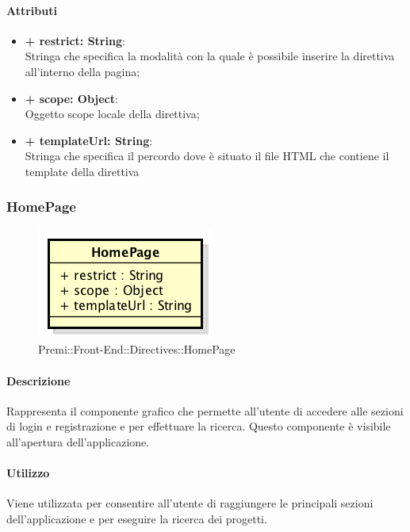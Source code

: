 	\paragraph{Attributi}
	\begin{itemize}
		\item \textbf{+ restrict: String}:\\
		Stringa che specifica la modalità con la quale è possibile inserire la direttiva all'interno della pagina;
		\item \textbf{+ scope: Object}:\\
		Oggetto scope locale della direttiva;
		\item \textbf{+ templateUrl: String}:\\
		Stringa che specifica il percordo dove è situato il file HTML che contiene il template della direttiva
	\end{itemize}
\newpage


\subsubsection{HomePage}
	\begin{figure}[h]
		\centering
		\includegraphics[width=0.5\linewidth]{img/premi_front_end_directives_homepage}
		\caption[Premi::Front-End::Directives::HomePage]{Premi::Front-End::Directives::HomePage}
	\end{figure}
	
	\paragraph{Descrizione}
	Rappresenta il componente grafico che permette all'utente di accedere alle sezioni di login e registrazione e per effettuare la ricerca. Questo componente è visibile all'apertura dell'applicazione.
	
	\paragraph{Utilizzo}
	Viene utilizzata per consentire all'utente di raggiungere le principali sezioni dell'applicazione e per eseguire la ricerca dei progetti.
		
